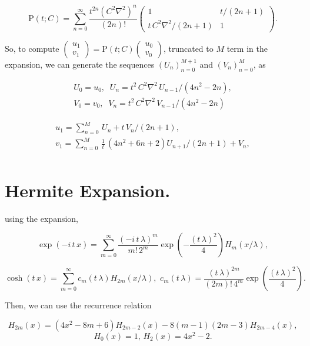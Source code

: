 \documentclass[amsmath,amssymb,floatfix]{revtex4}
\numberwithin{equation}{section}
\newcommand{\twomat}[4]{ \left( \begin{array}{cc} #1 & #2 \\ #3 & #4  \end{array} \right) }
\newcommand{\twovec}[2]{ \left( \begin{array}{c} #1  \\ #2   \end{array} \right) }
\begin{document}
\begin{equation}
	 \textrm{P}(t; C) = \sum_{n=0}^\infty \frac{t^{2n}(C^2\nabla^2)^n}{(2n)!}\twomat{1}{t/(2n+1)}{t \, C^2\nabla^2/(2n+1)}{1}.
\end{equation}

So, to compute $\twovec{u_1}{v_1} = \textrm{P}(t; C) \twovec{u_0}{v_0}$, truncated to $M$ term in the expansion, we can generate the sequences $(U_n)_{n=0}^{M+1}$ and $(V_n)_{n=0}^{M}$, as

\begin{eqnarray}
	 U_0 = u_0, \; \; U_n = t^2 \, C^2\nabla^2 \, U_{n-1} / {(4n^2-2n)},\\
  	 V_0 = v_0, \; \; V_n = t^2 \, C^2\nabla^2 \, V_{n-1} / {(4n^2-2n)}
\end{eqnarray}

\begin{eqnarray}
	 u_1 = \sum_{n=0}^M \, U_n +  t \, V_n/(2n+1),\\
	 v_1 = \sum_{n=0}^M \, \frac{1}{t} \, (4n^2+6n+2)U_{n+1}/(2n+1) + V_n,\\	 
\end{eqnarray}

\section{\label{sec:level3}Hermite Expansion.\protect}

\noindent using the expansion, 


\begin{equation}
	\exp{(-i \, t \, x)} = \sum_{m=0}^{\infty} \frac{(-i \, t \, \lambda)^{m}}{m! \, 2^{m}} \exp{\left(-\frac{( t \, \lambda  )^2}{4}\right)} H_m(x/\lambda),
\end{equation}

\begin{equation}
	\cosh{( t \, x)} = \sum_{m=0}^{\infty} c_m(t \, \lambda) H_{2m}(x/\lambda), \, \, c_m(t \, \lambda) =  \frac{(t \, \lambda)^{2m}}{(2m)! \, 4^{m}} \exp{\left(\frac{(t \, \lambda )^2}{4}\right)} .
\end{equation}

Then, we can use the recurrence relation


\begin{equation}
	H_{2m}(x) = (4x^2 -8m+6)H_{2m-2}(x)-8(m-1)(2m-3)H_{2m-4}(x),
\end{equation}
\begin{equation}
	 H_{0}(x) = 1, \, H_{2}(x) = 4x^2-2. \nonumber
\end{equation}
\end{document}

